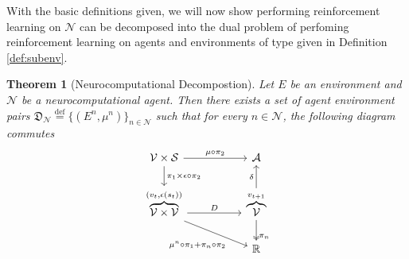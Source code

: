 \documentclass{article} %
\newtheorem{theorem}{Theorem}
\numberwithin{equation}{subsection}
\numberwithin{theorem}{subsection}
\def\reals{{\mathbb R}}
\def\defeq{\stackrel{\text{def}}{=}}
\theoremstyle{named}
\def\scriptv{{\mathcal V}}
\def\scripta{{\mathcal A}}
\def\scriptn{{\mathcal N}}
\def\scripts{{\mathcal S}}
\begin{document}
With the basic definitions given, we will now show performing reinforcement learning on $\scriptn$ can be decomposed into the dual problem of perfoming reinforcement learning on agents and environments of type given in Definition \ref{def:subenv}.

\begin{theorem}[Neurocomputational Decompostion]\label{thm:ncomp}
  Let $E$ be an environment and $\scriptn$ be a neurocomputational agent. Then there exists a set of agent environment pairs $\mathfrak{D}_\scriptn \defeq \{(E^n, \mu^n)\}_{n\in \scriptn}$ such that for every $n \in \scriptn$, the following diagram commutes
\begin{equation}\label{eq:sub_env_com}
          \begin{tikzcd} %
        \scriptv  \times \scripts \arrow{r}{\mu\circ\pi_2}
             \arrow{d}
               {\pi_1  \times\epsilon \circ \pi_2}  &[+25pt]  \scripta    \\
          \overbrace{\scriptv \times \scriptv}^{(v_{t},\epsilon(s_t))}
                      \arrow{r}{D}
                                  \arrow[pos = 0.7]{rd}[swap]{\mu^n\circ\pi_1 + \pi_n \circ \pi_2}
                      & \overbrace{\scriptv}^{v_{t+1}}
                                            \arrow[two heads, pos=0.8]
                                              {d}
                                              {\pi_n}
                                            \arrow{u}{\delta} \\
  &\reals
         \end{tikzcd}
    \end{equation}
\end{theorem}
\end{document}
